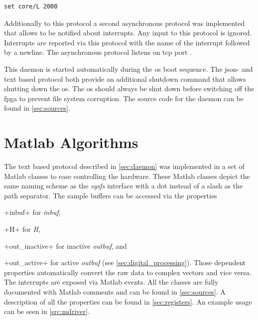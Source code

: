 \documentclass[12pt,a4paper,parskip=full,abstract=true,BCOR=12mm]{scrreprt}
\newcommand{\hack}{}
\newcommand*{\SavedLstInline}{}
\DeclareRobustCommand*{\lstinline}{%
  \ifmmode
    \let\SavedBGroup\bgroup
    \def\bgroup{%
      \let\bgroup\SavedBGroup
      \hbox\bgroup
    }%
  \fi
  \SavedLstInline
}
\def\device#1{\mbox{\textit{#1}}}
\begin{document}
\begin{lstlisting}[language={},float=htb,caption={Example line to set $\gls{L}=2000$ with the text based protocol},label=src:text,basicstyle=\hack\scriptsize]
set core/L 2000
\end{lstlisting}

Additionally to this protocol a second asynchronous
protocol was implemented that allows to be notified about interrupts. Any input to
this protocol is ignored. Interrupts are reported via this protocol with the name of the interrupt
followed by a newline. The asynchronous protocol listens on \gls{tcp} port {}.

This daemon is started automatically during the \gls{os} boot sequence. The \gls{json}- and
text based protocol both provide an additional shutdown command that allows shutting
down the \gls{os}. The \gls{os} should always be shut down before switching off the \gls{fpga}
to prevent file system corruption. The source code for the daemon can be found in \cref{sec:sources}.


\section{Matlab Algorithms}
\label{sec:matlab}
\lstset{language=Matlab}

The text based protocol described in \cref{sec:daemon} was implemented in a set of
Matlab classes to ease controlling the hardware. These Matlab classes depict the
same naming scheme as the \device{sysfs} interface with a dot instead of a slash
as the path separator. The sample buffers can be accessed via the properties
\lstinline+inbuf+ for \device{inbuf}, \lstinline+H+ for \device{H},
\lstinline+out_inactive+ for inactive \device{outbuf}, and \lstinline+out_active+
for active \device{outbuf} (see \cref{sec:digital_processing}). Those dependent properties automatically convert
the raw data to complex vectors and vice versa. The interrupts are exposed via
Matlab events. All the classes are fully documented with Matlab comments and
can be found in \cref{sec:sources}. A description of all the properties can
be found in \cref{sec:registers}. An example usage can be seen in \cref{src:mdriver}.
\end{document}
